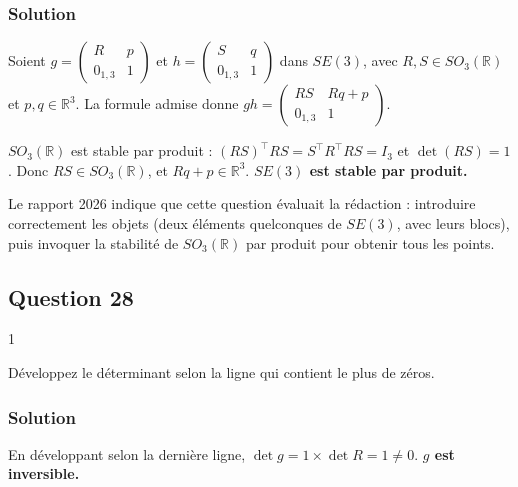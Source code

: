 \documentclass[11pt,a4paper]{article}
\begin{document}
\hypertarget{solution-26}{%
\subsubsection{Solution}\label{solution-26}}

Soient \(g=\begin{pmatrix}R&p\\0_{1,3}&1\end{pmatrix}\) et \(h=\begin{pmatrix}S&q\\0_{1,3}&1\end{pmatrix}\) dans \(SE(3)\), avec \(R,S\in SO_3(\mathbb{R})\) et \(p,q\in{\mathbb{R}}^3\). La formule admise donne \(gh=\begin{pmatrix}RS&Rq+p\\0_{1,3}&1\end{pmatrix}\).

\(SO_3(\mathbb{R})\) est stable par produit : \((RS)^\top RS=S^\top R^\top RS=I_3\) et \(\det(RS)=1\). Donc \(RS\in SO_3(\mathbb{R})\), et \(Rq+p\in{\mathbb{R}}^3\). \textbf{\(SE(3)\) est stable par produit.}

\begin{jury}

Le rapport 2026 indique que cette question évaluait la rédaction : introduire correctement les objets (deux éléments quelconques de \(SE(3)\), avec leurs blocs), puis invoquer la stabilité de \(SO_3(\mathbb{R})\) par produit pour obtenir tous les points.

\end{jury}

\hypertarget{question-28}{%
\subsection{Question 28}\label{question-28}}

\begin{indication}{1}

Développez le déterminant selon la ligne qui contient le plus de zéros.

\end{indication}

\hypertarget{solution-27}{%
\subsubsection{Solution}\label{solution-27}}

En développant selon la dernière ligne, \(\det g=1\times\det R=1\neq0\). \textbf{\(g\) est inversible.}
\end{document}
